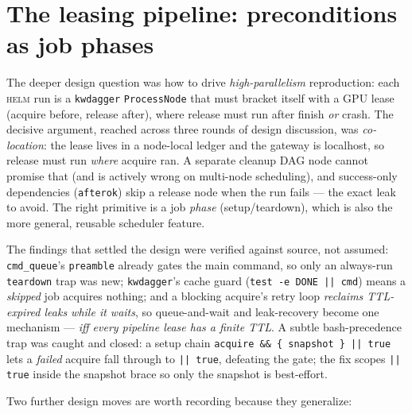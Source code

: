 \documentclass[11pt]{report}
\newcommand{\code}[1]{\texttt{#1}}
\begin{document}
\section{The leasing pipeline: preconditions as job phases}

The deeper design question was how to drive \emph{high-parallelism} reproduction:
each \textsc{helm} run is a \code{kwdagger} \code{ProcessNode} that must bracket
itself with a GPU lease (acquire before, release after), where release must run
after finish \emph{or} crash. The decisive argument, reached across three rounds of
design discussion, was \emph{co-location}: the lease lives in a node-local ledger
and the gateway is localhost, so release must run \emph{where} acquire ran. A
separate cleanup DAG node cannot promise that (and is actively wrong on multi-node
scheduling), and success-only dependencies (\code{afterok}) skip a release node
when the run fails --- the exact leak to avoid. The right primitive is a job
\emph{phase} (setup/teardown), which is also the more general, reusable scheduler
feature.

The findings that settled the design were verified against source, not assumed:
\code{cmd\_queue}'s \code{preamble} already gates the main command, so only an
always-run \code{teardown} trap was new; \code{kwdagger}'s cache guard
(\code{test -e DONE || cmd}) means a \emph{skipped} job acquires nothing; and a
blocking acquire's retry loop \emph{reclaims TTL-expired leaks while it waits}, so
queue-and-wait and leak-recovery become one mechanism --- \emph{iff every pipeline
lease has a finite TTL}. A subtle bash-precedence trap was caught and closed: a
setup chain \code{acquire \&\& \{ snapshot \} || true} lets a \emph{failed}
acquire fall through to \code{|| true}, defeating the gate; the fix scopes
\code{|| true} inside the snapshot brace so only the snapshot is best-effort.

Two further design moves are worth recording because they generalize:
\end{document}
